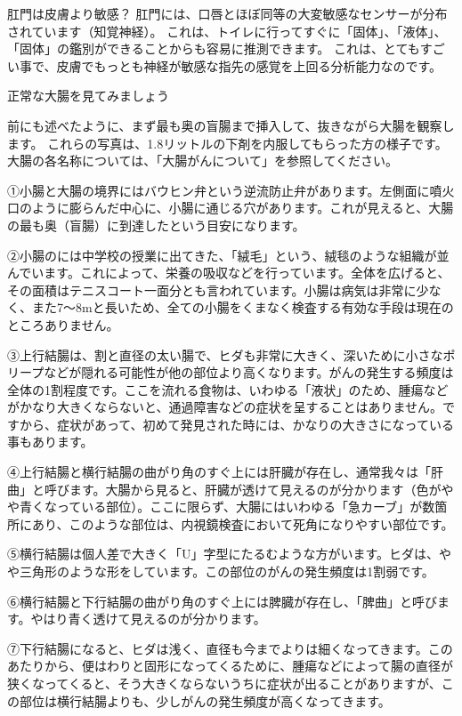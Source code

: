 肛門は皮膚より敏感？
肛門には、口唇とほぼ同等の大変敏感なセンサーが分布されています（知覚神経）。
これは、トイレに行ってすぐに「固体」、「液体」、「固体」の鑑別ができることからも容易に推測できます。
これは、とてもすごい事で、皮膚でもっとも神経が敏感な指先の感覚を上回る分析能力なのです。



正常な大腸を見てみましょう

前にも述べたように、まず最も奥の盲腸まで挿入して、抜きながら大腸を観察します。
これらの写真は、1.8リットルの下剤を内服してもらった方の様子です。
大腸の各名称については、「大腸がんについて」を参照してください。

①小腸と大腸の境界にはバウヒン弁という逆流防止弁があります。左側面に噴火口のように膨らんだ中心に、小腸に通じる穴があります。これが見えると、大腸の最も奥（盲腸）に到達したという目安になります。

②小腸のには中学校の授業に出てきた、「絨毛」という、絨毯のような組織が並んでいます。これによって、栄養の吸収などを行っています。全体を広げると、その面積はテニスコート一面分とも言われています。小腸は病気は非常に少なく、また7～8mと長いため、全ての小腸をくまなく検査する有効な手段は現在のところありません。

③上行結腸は、割と直径の太い腸で、ヒダも非常に大きく、深いために小さなポリープなどが隠れる可能性が他の部位より高くなります。がんの発生する頻度は全体の1割程度です。ここを流れる食物は、いわゆる「液状」のため、腫瘍などがかなり大きくならないと、通過障害などの症状を呈することはありません。ですから、症状があって、初めて発見された時には、かなりの大きさになっている事もあります。

④上行結腸と横行結腸の曲がり角のすぐ上には肝臓が存在し、通常我々は「肝曲」と呼びます。大腸から見ると、肝臓が透けて見えるのが分かります（色がやや青くなっている部位）。ここに限らず、大腸にはいわゆる「急カーブ」が数箇所にあり、このような部位は、内視鏡検査において死角になりやすい部位です。

⑤横行結腸は個人差で大きく「U」字型にたるむような方がいます。ヒダは、やや三角形のような形をしています。この部位のがんの発生頻度は1割弱です。

⑥横行結腸と下行結腸の曲がり角のすぐ上には脾臓が存在し、「脾曲」と呼びます。やはり青く透けて見えるのが分かります。

⑦下行結腸になると、ヒダは浅く、直径も今までよりは細くなってきます。このあたりから、便はわりと固形になってくるために、腫瘍などによって腸の直径が狭くなってくると、そう大きくならないうちに症状が出ることがありますが、この部位は横行結腸よりも、少しがんの発生頻度が高くなってきます。

